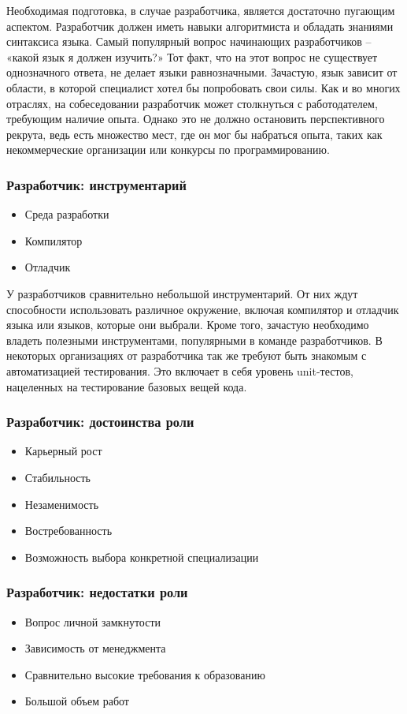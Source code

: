 \documentclass{../industrial-development}
\begin{document}
Необходимая подготовка, в случае разработчика, является достаточно пугающим аспектом. Разработчик должен иметь навыки алгоритмиста и обладать знаниями синтаксиса языка. Самый популярный вопрос начинающих разработчиков – «какой язык я должен изучить?» Тот факт, что на этот вопрос не существует однозначного ответа, не делает языки равнозначными. Зачастую, язык зависит от области, в которой специалист хотел бы попробовать свои силы. 
Как и во многих отраслях, на собеседовании разработчик может столкнуться с работодателем, требующим наличие опыта. Однако это не должно остановить перспективного рекрута, ведь есть множество мест, где он мог бы набраться опыта, таких как некоммерческие организации или конкурсы по программированию. 
 ~\cite{Anatomy}

\begin{frame} \frametitle{Разработчик: инструментарий}
  \begin{itemize}
  \item Среда разработки
  \item Компилятор
  \item Отладчик
  \end{itemize}
\end{frame}

\lecturenotes

У разработчиков сравнительно небольшой инструментарий. От них ждут способности использовать различное окружение, включая компилятор и отладчик языка или языков, которые они выбрали. Кроме того, зачастую необходимо владеть полезными инструментами, популярными в команде разработчиков. 
В некоторых организациях от разработчика так же требуют быть знакомым с автоматизацией тестирования. Это включает в себя уровень unit-тестов, нацеленных на тестирование базовых вещей кода. 
  ~\cite{Anatomy}

\begin{frame} \frametitle{Разработчик: достоинства роли}
  \begin{itemize}
  \item Карьерный рост
  \item Стабильность
  \item Незаменимость
  \item Востребованность 
  \item Возможность выбора конкретной специализации
  \end{itemize}
\end{frame}

\begin{frame} \frametitle{Разработчик: недостатки роли}
  \begin{itemize}
  \item Вопрос личной замкнутости
  \item Зависимость от менеджмента
  \item Сравнительно высокие требования к образованию
  \item Большой объем работ
  \end{itemize}
\end{frame}
\end{document}
